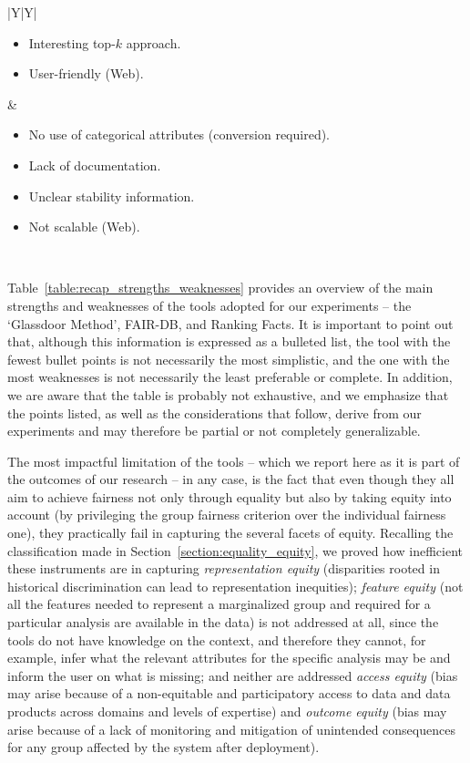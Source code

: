 \begin{table}[t!]
\begin{tabularx}{\columnwidth}{|Y|Y|}
\begin{itemize}[topsep=0pt,leftmargin=*]
\item \nohyphens{Interesting top-\(k\) approach.}
\item \nohyphens{User-friendly (Web).}
\end{itemize} & \begin{itemize}[topsep=0pt,leftmargin=*]
\item \nohyphens{No use of categorical attributes (conversion required).}
\item \nohyphens{Lack of documentation.}\vspace{2\baselineskip}
\item \nohyphens{Unclear stability information.}
\item \nohyphens{Not scalable (Web).}
\end{itemize}\\
\hline
\end{tabularx}
\centering
\caption{Recap of the strengths and weaknesses of the tools used for the experiments.}
\label{table:recap_strengths_weaknesses}
\end{table}

Table~\ref{table:recap_strengths_weaknesses} provides an overview of the main strengths and weaknesses of the tools adopted for our experiments -- the `Glassdoor Method', FAIR-DB, and Ranking Facts. It is important to point out that, although this information is expressed as a bulleted list, the tool with the fewest bullet points is not necessarily the most simplistic, and the one with the most weaknesses is not necessarily the least preferable or complete. In addition, we are aware that the table is probably not exhaustive, and we emphasize that the points listed, as well as the considerations that follow, derive from our experiments and may therefore be partial or not completely generalizable.

The most impactful limitation of the tools -- which we report here as it is part of the outcomes of our research -- in any case, is the fact that even though they all aim to achieve fairness not only through equality but also by taking equity into account (by privileging the group fairness criterion over the individual fairness one), they practically fail in capturing the several facets of equity. Recalling the classification made in Section~\ref{section:equality_equity}, we proved how inefficient these instruments are in capturing \textit{representation equity} (disparities rooted in historical discrimination can lead to representation inequities); \textit{feature equity} (not all the features needed to represent a marginalized group and required for a particular analysis are available in the data) is not addressed at all, since the tools do not have knowledge on the context, and therefore they cannot, for example, infer what the relevant attributes for the specific analysis may be and inform the user on what is missing; and neither are addressed \textit{access equity} (bias may arise because of a non-equitable and participatory access to data and data products across domains and levels of expertise) and \textit{outcome equity} (bias may arise because of a lack of monitoring and mitigation of unintended consequences for any group affected by the system after deployment).

